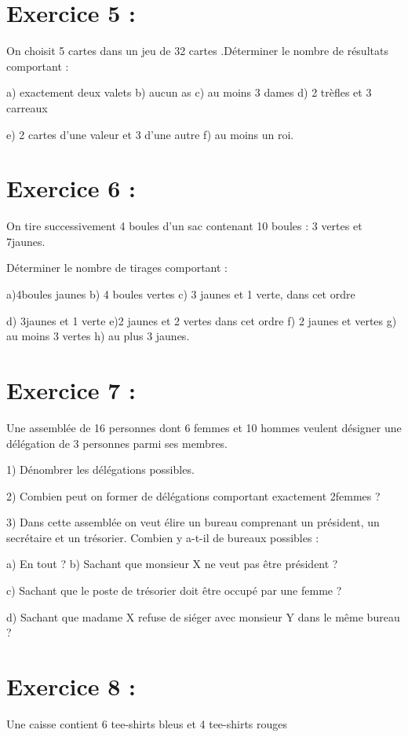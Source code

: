 \documentclass[12pt]{article}
\begin{document}
\section*{Exercice 5 :}
On choisit 5 cartes dans un jeu de 32 cartes .Déterminer le nombre de résultats comportant :

    a) exactement deux valets     b) aucun as      c) au moins 3 dames    d) 2 trèfles et 3 carreaux
    
e) 2 cartes d’une valeur et 3 d’une autre        f) au moins un roi.

\section*{Exercice 6 :}
On tire successivement 4 boules d’un sac contenant 10 boules : 3 vertes et 7jaunes.

Déterminer le nombre de tirages comportant :

a)4boules jaunes     b) 4 boules vertes         c) 3 jaunes et 1 verte, dans cet ordre 

d) 3jaunes et 1 verte       e)2 jaunes et 2 vertes dans cet ordre       f) 2 jaunes et vertes g) au moins 3 vertes 		h) au plus 3 jaunes.
\section*{Exercice 7 :}
Une assemblée de 16 personnes dont 6 femmes et 10 hommes veulent désigner une délégation de 3 personnes parmi ses membres.

    1) Dénombrer les délégations possibles.
    
    2) Combien peut on former de délégations comportant exactement 2femmes ?
    
    3) Dans cette assemblée on veut élire un bureau comprenant un président, un secrétaire et un trésorier. Combien y a-t-il de bureaux possibles :
    
           a) En tout ?  b) Sachant que monsieur X ne veut pas être président ?
           
           c) Sachant que le poste de trésorier doit être occupé par une femme ?
           
          d) Sachant que madame X refuse de siéger avec monsieur Y dans le même bureau ? 
\section*{Exercice 8 :}
Une caisse contient 6 tee-shirts bleus et 4 tee-shirts rouges
\end{document}
